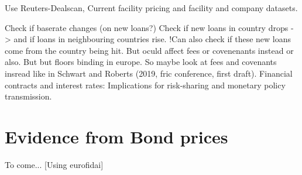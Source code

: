 \documentclass[11pt]{article}
\begin{document}
Use Reuters-Dealscan, Current facility pricing and facility and company datasets.

Check if baserate changes (on new loans?)
Check if new loans in country drops -> and if loans in neighbouring countries rise. !Can also check if these new loans come from the country being hit.
But oculd affect fees or covenenants instead or also.
But but floors binding in europe. So maybe look at fees and covenants insread like in Schwart and Roberts (2019, fric conference, first draft). Financial contracts and interest rates: Implications for risk-sharing and monetary policy transmission. 

\section{Evidence from Bond prices}
To come...
[Using eurofidai]

\fi

\clearpage


\end{document}
